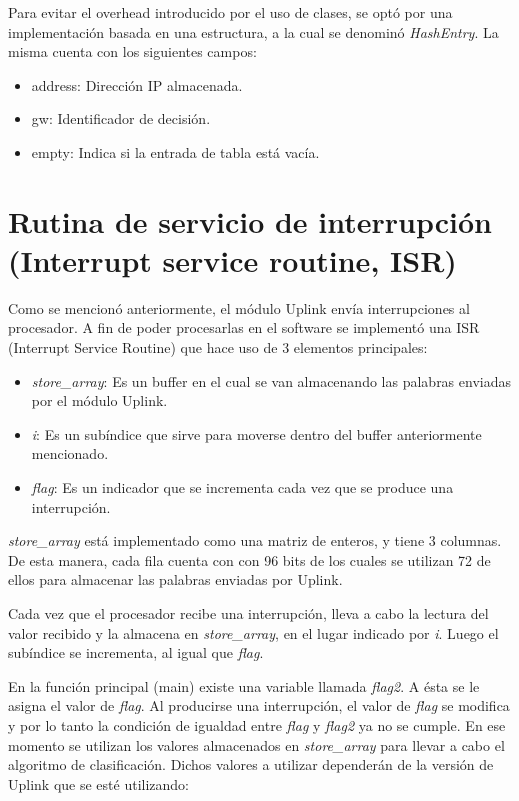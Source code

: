 Para evitar el overhead introducido por el uso de clases, se optó por una implementación basada en una estructura, a la cual se denominó \textit{HashEntry}. La misma cuenta con los siguientes campos:

\begin{itemize}
	\item address: Dirección IP almacenada.
	\item gw: Identificador de decisión.
	\item empty: Indica si la entrada de tabla está vacía.
\end{itemize}

\section{Rutina de servicio de interrupción (Interrupt service routine, ISR)}

Como se mencionó anteriormente, el módulo Uplink envía interrupciones al procesador. A fin de poder procesarlas en el software se implementó una ISR (Interrupt Service Routine) que hace uso de 3 elementos principales:

\begin{itemize}
	\item \textit{store\_array}: Es un buffer en el cual se van almacenando las palabras enviadas por el módulo Uplink.
	\item \textit{i}: Es un subíndice que sirve para moverse dentro del buffer anteriormente mencionado.
	\item \textit{flag}: Es un indicador que se incrementa cada vez que se produce una interrupción.
\end{itemize}

\textit{store\_array} está implementado como una matriz de enteros, y tiene 3 columnas. De esta manera, cada fila cuenta con con 96 bits de los cuales se utilizan 72 de ellos para almacenar las palabras enviadas por Uplink.

Cada vez que el procesador recibe una interrupción, lleva a cabo la lectura del valor recibido y la almacena en \textit{store\_array}, en el lugar indicado por \textit{i}. Luego el subíndice se incrementa, al igual que \textit{flag}.

En la función principal (main) existe una variable llamada \textit{flag2}. A ésta se le asigna el valor de \textit{flag}. Al producirse una interrupción, el valor de \textit{flag} se modifica y por lo tanto la condición de igualdad entre \textit{flag} y \textit{flag2} ya no se cumple. En ese momento se utilizan los valores almacenados en \textit{store\_array} para llevar a cabo el algoritmo de clasificación. Dichos valores a utilizar dependerán de la versión de Uplink que se esté utilizando:

